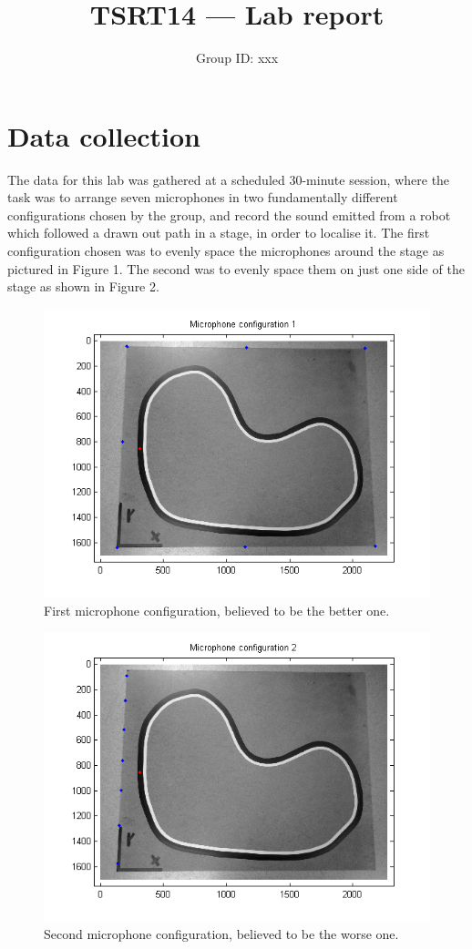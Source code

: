 \documentclass[11pt]{article}
\title{TSRT14 --- Lab report}
\author{Group ID: xxx}
\begin{document}
\maketitle
\newpage
\section{Data collection}
The data for this lab was gathered at a scheduled 30-minute session, where the task was to arrange seven microphones in two fundamentally different configurations chosen by the group, and record the sound emitted from a robot which followed a drawn out path in a stage, in order to localise it. The first configuration chosen was to evenly space the microphones around the stage as pictured in Figure 1. The second was to evenly space them on just one side of the stage as shown in Figure 2.
\begin{figure}[h!]
\centering
\includegraphics[width=\textwidth]{microphone_configuration_1.png}
\caption{First microphone configuration, believed to be the better one.}
\end{figure}
\begin{figure}[h!]
\centering
\includegraphics[width=\textwidth]{microphone_configuration_2.png}
\caption{Second microphone configuration, believed to be the worse one.}
\end{figure}
\end{document}
